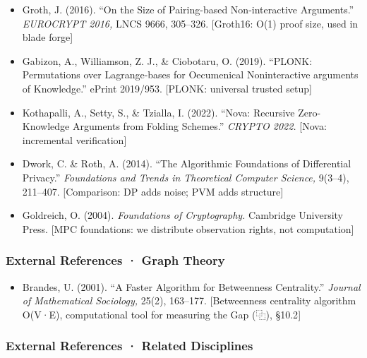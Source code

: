 \documentclass[
]{article}
\providecommand{\tightlist}{%
  \setlength{\itemsep}{0pt}\setlength{\parskip}{0pt}}
\begin{document}
\begin{itemize}
\tightlist
\item
  Groth, J. (2016). ``On the Size of Pairing-based Non-interactive
  Arguments.'' \emph{EUROCRYPT 2016,} LNCS 9666, 305--326. {[}Groth16:
  O(1) proof size, used in blade forge{]}
\item
  Gabizon, A., Williamson, Z. J., \& Ciobotaru, O. (2019). ``PLONK:
  Permutations over Lagrange-bases for Oecumenical Noninteractive
  arguments of Knowledge.'' ePrint 2019/953. {[}PLONK: universal trusted
  setup{]}
\item
  Kothapalli, A., Setty, S., \& Tzialla, I. (2022). ``Nova: Recursive
  Zero-Knowledge Arguments from Folding Schemes.'' \emph{CRYPTO 2022.}
  {[}Nova: incremental verification{]}
\item
  Dwork, C. \& Roth, A. (2014). ``The Algorithmic Foundations of
  Differential Privacy.'' \emph{Foundations and Trends in Theoretical
  Computer Science,} 9(3--4), 211--407. {[}Comparison: DP adds noise;
  PVM adds structure{]}
\item
  Goldreich, O. (2004). \emph{Foundations of Cryptography.} Cambridge
  University Press. {[}MPC foundations: we distribute observation
  rights, not computation{]}
\end{itemize}

\subsubsection{External References · Graph
Theory}\label{external-references-graph-theory}

\begin{itemize}
\tightlist
\item
  Brandes, U. (2001). ``A Faster Algorithm for Betweenness Centrality.''
  \emph{Journal of Mathematical Sociology,} 25(2), 163--177.
  {[}Betweenness centrality algorithm O(V·E), computational tool for
  measuring the Gap (⿻), §10.2{]}
\end{itemize}

\subsubsection{External References · Related
Disciplines}\label{external-references-related-disciplines}
\end{document}
